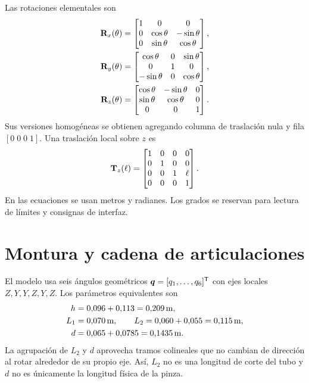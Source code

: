 Las rotaciones elementales son
\begin{align}
\mathbf{R}_x(\theta)&=\begin{bmatrix}1&0&0\\0&\cos\theta&-\sin\theta\\0&\sin\theta&\cos\theta\end{bmatrix},\\
\mathbf{R}_y(\theta)&=\begin{bmatrix}\cos\theta&0&\sin\theta\\0&1&0\\-\sin\theta&0&\cos\theta\end{bmatrix},\\
\mathbf{R}_z(\theta)&=\begin{bmatrix}\cos\theta&-\sin\theta&0\\\sin\theta&\cos\theta&0\\0&0&1\end{bmatrix}.
\end{align}
Sus versiones homogéneas se obtienen agregando columna de traslación nula y fila $[0\;0\;0\;1]$. Una traslación local sobre $z$ es
\begin{equation}
\mathbf{T}_z(\ell)=\begin{bmatrix}1&0&0&0\\0&1&0&0\\0&0&1&\ell\\0&0&0&1\end{bmatrix}.
\end{equation}
En las ecuaciones se usan metros y radianes. Los grados se reservan para lectura de límites y consignas de interfaz.

\section{Montura y cadena de articulaciones}
El modelo usa seis ángulos geométricos $\boldsymbol{q}=[q_1,\ldots,q_6]^{\mathsf{T}}$ con ejes locales $Z,Y,Y,Z,Y,Z$. Los parámetros equivalentes son
\begin{align}
h&=0{,}096+0{,}113=0{,}209\,\mathrm{m},\\
L_1&=0{,}070\,\mathrm{m},\qquad
L_2=0{,}060+0{,}055=0{,}115\,\mathrm{m},\\
d&=0{,}065+0{,}0785=0{,}1435\,\mathrm{m}.
\end{align}
La agrupación de $L_2$ y $d$ aprovecha tramos colineales que no cambian de dirección al rotar alrededor de su propio eje. Así, $L_2$ no es una longitud de corte del tubo y $d$ no es únicamente la longitud física de la pinza.

